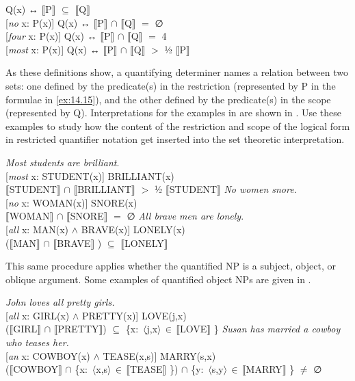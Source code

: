 \ea \label{ex:14.15}
\ea {} Q(x)  ↔   $\llbracket$P$\rrbracket$  ${\subseteq}$ $\llbracket$Q$\rrbracket$ \\
\ex{} [\textit{no} x: P(x)] Q(x)  ↔   $\llbracket$P$\rrbracket$  ${\cap}$ $\llbracket$Q$\rrbracket$  $=$ ∅ \\
\ex{} [\textit{four} x: P(x)] Q(x)  ↔   {\textbar} $\llbracket$P$\rrbracket$  ${\cap}$ $\llbracket$Q$\rrbracket$  {\textbar}  $=$ 4\\
\ex{} [\textit{most} x: P(x)] Q(x)  ↔   {\textbar} $\llbracket$P$\rrbracket$  ${\cap}$ $\llbracket$Q$\rrbracket$  {\textbar}  $>$  ½ {\textbar} $\llbracket$P$\rrbracket$ {\textbar}
                       \z
\z


As these definitions show, a quantifying determiner names a relation between two sets: one defined by the predicate(s) in the restriction (represented by P in the formulae in \ref{ex:14.15}), and the other defined by the predicate(s) in the scope (represented by Q). Interpretations for the examples in  are shown in . Use these examples to study how the content of the restriction and scope of the logical form in restricted quantifier notation get inserted into the set theoretic interpretation.


\ea \label{ex:14.16}
\ea  \textit{Most students are brilliant}.\\
{}[\textit{most} x: STUDENT(x)] BRILLIANT(x)\\
{\textbar} $\llbracket$STUDENT$\rrbracket$  ${\cap}$ $\llbracket$BRILLIANT$\rrbracket$  {\textbar}  $>$  ½ \textsc{{\textbar}} $\llbracket$STUDENT$\rrbracket$ {\textbar}
\ex \textit{No women snore}.\\
{}[\textit{no} x: WOMAN(x)] SNORE(x)\\
$\llbracket$WOMAN$\rrbracket$  ${\cap}$ $\llbracket$SNORE$\rrbracket$  $=$ ∅
\ex   \textit{All brave men are lonely}.\\
{}[\textit{all} x: MAN(x) $\wedge$ BRAVE(x)] LONELY(x)\\
($\llbracket$MAN$\rrbracket$  ${\cap}$ $\llbracket$BRAVE$\rrbracket$ )  ${\subseteq}$ $\llbracket$LONELY$\rrbracket$ 
\z \z


This same procedure applies whether the quantified NP is a subject, object, or oblique argument. Some examples of quantified object NPs are given in .


\ea \label{ex:14.17}
\ea \textit{John loves all pretty girls.}\\
{}[\textit{all} x: GIRL(x) $\wedge$ PRETTY(x)] LOVE(j,x)\\
($\llbracket$GIRL$\rrbracket$  ${\cap}$ $\llbracket$PRETTY$\rrbracket$) ${\subseteq}$ \{x:~$\langle$j,x$\rangle \, {\in} \, \llbracket$LOVE$\rrbracket$ \}
\ex \textit{Susan has married a cowboy who teases her.}\\
{}[\textit{an} x: COWBOY(x) $\wedge$ TEASE(x,s)] MARRY(s,x)\\
($\llbracket$COWBOY$\rrbracket$  ${\cap}$ \{x:~$\langle$x,s$\rangle \, {\in} \, \llbracket$TEASE$\rrbracket$ \}) ${\cap}$ \{y:~$\langle$s,y$\rangle \, {\in} \, \llbracket$MARRY$\rrbracket$ \} $\neq$ ∅ 
\z \z


